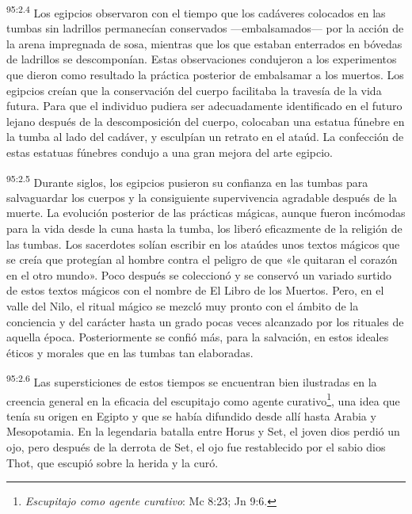 \par
\textsuperscript{95:2.4} Los egipcios observaron con el tiempo que los cadáveres colocados en las tumbas sin ladrillos permanecían conservados ---embalsamados--- por la acción de la arena impregnada de sosa, mientras que los que estaban enterrados en bóvedas de ladrillos se descomponían. Estas observaciones condujeron a los experimentos que dieron como resultado la práctica posterior de embalsamar a los muertos. Los egipcios creían que la conservación del cuerpo facilitaba la travesía de la vida futura. Para que el individuo pudiera ser adecuadamente identificado en el futuro lejano después de la descomposición del cuerpo, colocaban una estatua fúnebre en la tumba al lado del cadáver, y esculpían un retrato en el ataúd. La confección de estas estatuas fúnebres condujo a una gran mejora del arte egipcio.

\par
\textsuperscript{95:2.5} Durante siglos, los egipcios pusieron su confianza en las tumbas para salvaguardar los cuerpos y la consiguiente supervivencia agradable después de la muerte. La evolución posterior de las prácticas mágicas, aunque fueron incómodas para la vida desde la cuna hasta la tumba, los liberó eficazmente de la religión de las tumbas. Los sacerdotes solían escribir en los ataúdes unos textos mágicos que se creía que protegían al hombre contra el peligro de que «le quitaran el corazón en el otro mundo». Poco después se coleccionó y se conservó un variado surtido de estos textos mágicos con el nombre de El Libro de los Muertos. Pero, en el valle del Nilo, el ritual mágico se mezcló muy pronto con el ámbito de la conciencia y del carácter hasta un grado pocas veces alcanzado por los rituales de aquella época. Posteriormente se confió más, para la salvación, en estos ideales éticos y morales que en las tumbas tan elaboradas.

\par
\textsuperscript{95:2.6} Las supersticiones de estos tiempos se encuentran bien ilustradas en la creencia general en la eficacia del escupitajo como agente curativo\footnote{\textit{Escupitajo como agente curativo}: Mc 8:23; Jn 9:6.}, una idea que tenía su origen en Egipto y que se había difundido desde allí hasta Arabia y Mesopotamia. En la legendaria batalla entre Horus y Set, el joven dios perdió un ojo, pero después de la derrota de Set, el ojo fue restablecido por el sabio dios Thot, que escupió sobre la herida y la curó.

